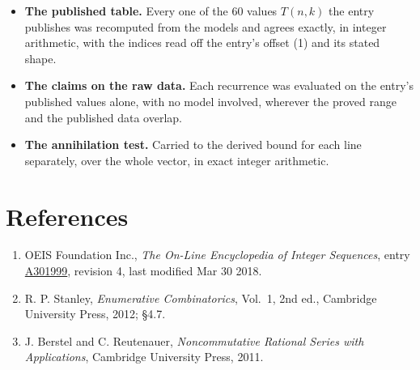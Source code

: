 \documentclass[11pt]{article}
\theoremstyle{definition}
\begin{document}
\begin{itemize}

\item {\bfseries The published table.} Every one of the 60 values $T(n,k)$ the entry publishes was recomputed from the models and agrees exactly, in integer arithmetic, with the indices read off the entry's offset (1) and its stated shape.

\item {\bfseries The claims on the raw data.} Each recurrence was evaluated on the entry's published values alone, with no model involved, wherever the proved range and the published data overlap.

\item {\bfseries The annihilation test.} Carried to the derived bound for each line separately, over the whole vector, in exact integer arithmetic.

\end{itemize}

\section{References}

\begin{enumerate}

\item OEIS Foundation Inc., \emph{The On-Line Encyclopedia of Integer Sequences}, entry \href{https://oeis.org/A301999}{A301999}, revision 4, last modified Mar 30 2018.

\item R. P. Stanley, \emph{Enumerative Combinatorics}, Vol.~1, 2nd ed., Cambridge University Press, 2012; \S4.7.

\item J. Berstel and C. Reutenauer, \emph{Noncommutative Rational Series with Applications}, Cambridge University Press, 2011.

\end{enumerate}
\end{document}
